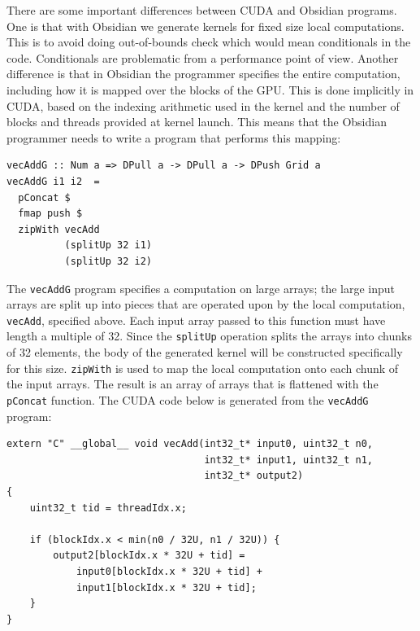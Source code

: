 \documentclass[a4paper]{book}
\begin{document}
There are some important differences between CUDA and Obsidian programs. One is that with Obsidian 
we generate kernels for fixed size local computations. This is to avoid doing out-of-bounds check 
which would mean conditionals in the code. Conditionals are problematic from a performance 
point of view. Another difference is that in Obsidian the programmer specifies the entire 
computation, including how it is mapped over the blocks of the GPU. This is done implicitly 
in CUDA, based on the indexing arithmetic used in the kernel and the number of blocks and 
threads provided at kernel launch. This means that the Obsidian programmer needs to 
write a program that performs this mapping: 

\begin{small} 
\begin{Verbatim}[samepage=true]
vecAddG :: Num a => DPull a -> DPull a -> DPush Grid a
vecAddG i1 i2  =
  pConcat $
  fmap push $ 
  zipWith vecAdd
          (splitUp 32 i1)
          (splitUp 32 i2)  
\end{Verbatim}
\end{small} 

The {\tt vecAddG} program specifies a computation on large arrays; the large input arrays 
are split up into pieces that are operated upon by the local computation, {\tt vecAdd}, 
specified above. Each input array passed to this function must have length a multiple of 32.
Since the {\tt splitUp} operation splits the arrays into chunks of 32 elements, the body 
of the generated kernel will be constructed specifically for this size. {\tt zipWith} is 
used to map the local computation onto each chunk of the input arrays. The result is an 
array of arrays that is flattened with the {\tt pConcat} function. The CUDA code below 
is generated from the {\tt vecAddG} program: 

\begin{small}
\begin{Verbatim}[samepage=true] 
extern "C" __global__ void vecAdd(int32_t* input0, uint32_t n0,
                                  int32_t* input1, uint32_t n1,
                                  int32_t* output2)
{
    uint32_t tid = threadIdx.x;
    
    if (blockIdx.x < min(n0 / 32U, n1 / 32U)) {
        output2[blockIdx.x * 32U + tid] = 
            input0[blockIdx.x * 32U + tid] +
            input1[blockIdx.x * 32U + tid];
    }
}
\end{Verbatim}
\end{small} 
\end{document}
